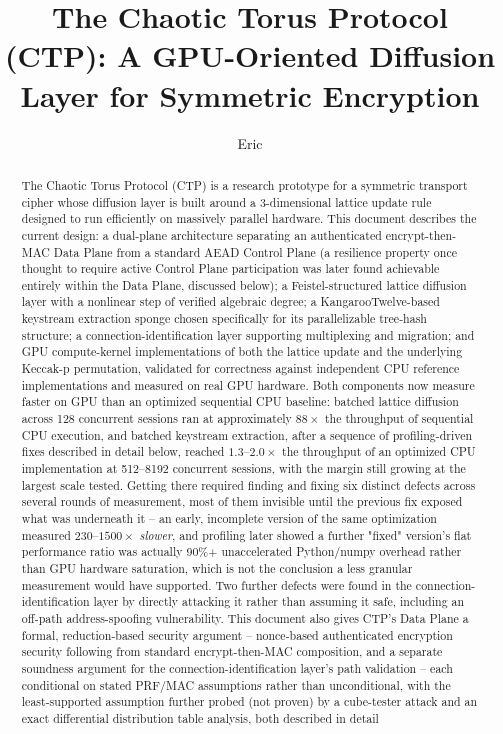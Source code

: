 \documentclass[twocolumn,10pt,journal,compsoc]{IEEEtran}
\begin{document}
\title{The Chaotic Torus Protocol (CTP): A GPU-Oriented Diffusion Layer for Symmetric Encryption}

\author{Eric}

\maketitle

\begin{abstract}
The Chaotic Torus Protocol (CTP) is a research prototype for a symmetric transport cipher whose diffusion layer is built around a 3-dimensional lattice update rule designed to run efficiently on massively parallel hardware. This document describes the current design: a dual-plane architecture separating an authenticated encrypt-then-MAC Data Plane from a standard AEAD Control Plane (a resilience property once thought to require active Control Plane participation was later found achievable entirely within the Data Plane, discussed below); a Feistel-structured lattice diffusion layer with a nonlinear step of verified algebraic degree; a KangarooTwelve-based keystream extraction sponge chosen specifically for its parallelizable tree-hash structure; a connection-identification layer supporting multiplexing and migration; and GPU compute-kernel implementations of both the lattice update and the underlying Keccak-p permutation, validated for correctness against independent CPU reference implementations and measured on real GPU hardware. Both components now measure faster on GPU than an optimized sequential CPU baseline: batched lattice diffusion across 128 concurrent sessions ran at approximately $88\times$ the throughput of sequential CPU execution, and batched keystream extraction, after a sequence of profiling-driven fixes described in detail below, reached $1.3$--$2.0\times$ the throughput of an optimized CPU implementation at 512--8192 concurrent sessions, with the margin still growing at the largest scale tested. Getting there required finding and fixing six distinct defects across several rounds of measurement, most of them invisible until the previous fix exposed what was underneath it -- an early, incomplete version of the same optimization measured $230$--$1500\times$ \emph{slower}, and profiling later showed a further "fixed" version's flat performance ratio was actually 90\%+ unaccelerated Python/numpy overhead rather than GPU hardware saturation, which is not the conclusion a less granular measurement would have supported. Two further defects were found in the connection-identification layer by directly attacking it rather than assuming it safe, including an off-path address-spoofing vulnerability. This document also gives CTP's Data Plane a formal, reduction-based security argument -- nonce-based authenticated encryption security following from standard encrypt-then-MAC composition, and a separate soundness argument for the connection-identification layer's path validation -- each conditional on stated PRF/MAC assumptions rather than unconditional, with the least-supported assumption further probed (not proven) by a cube-tester attack and an exact differential distribution table analysis, both described in detail 
\end{abstract}
\end{document}
